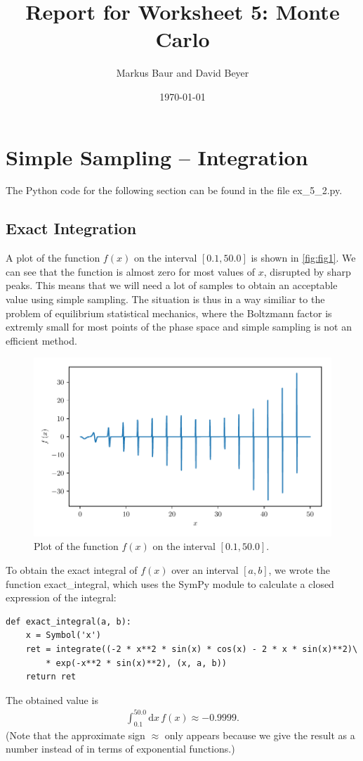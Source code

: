 \documentclass[a4paper,10pt,bibtotoc]{scrartcl}
\begin{document}
\titlehead{Simulation Methods in Physics I \hfill WS 2019/2010}
\title{Report for Worksheet 5: Monte Carlo}
\author{Markus Baur and David Beyer}
\date{\today}
\maketitle

\tableofcontents
\section{Simple Sampling -- Integration}
The Python code for the following section can be found in the file ex\_5\_2.py.
\subsection{Exact Integration}
A plot of the function $f(x)$ on the interval $\left[0.1,50.0\right]$ is shown in \autoref{fig:fig1}. 
We can see that the function is almost zero for most values of $x$, disrupted by sharp peaks.
This means that we will need a lot of samples to obtain an acceptable value using simple sampling.
The situation is thus in a way similiar to the problem of equilibrium statistical mechanics, where the Boltzmann factor is extremly small for most points of the phase space and simple sampling is not an efficient method.
\begin{figure}
	\centering
	\includegraphics[width=\linewidth]{plotf.pdf}
	\caption{Plot of the function $f(x)$ on the interval $\left[0.1,50.0\right]$.}
	\label{fig:fig1}
\end{figure}

To obtain the exact integral of $f(x)$ over an interval $\left[a, b\right]$, we wrote the function exact\_integral, which uses the SymPy module to calculate a closed expression of the integral:
\begin{lstlisting}
def exact_integral(a, b):
    x = Symbol('x')
    ret = integrate((-2 * x**2 * sin(x) * cos(x) - 2 * x * sin(x)**2)\
        * exp(-x**2 * sin(x)**2), (x, a, b))
    return ret
\end{lstlisting}
The obtained value is
\begin{align}
\int_{0.1}^{50.0}\mathrm{d}x\,f(x)\approx -0.9999.
\end{align}
(Note that the approximate sign $\approx$ only appears because we give the result as a number instead of in terms of exponential functions.)
\end{document}

